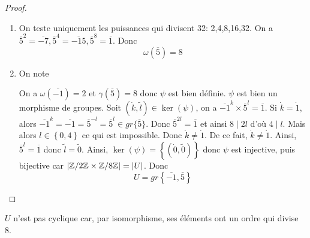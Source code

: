 \documentclass[12pt]{article}
\begin{document}
\begin{proof}
	\phantom{}
	\begin{enumerate}
		\item On teste uniquement les puissances qui divisent 32: 2,4,8,16,32. On a $\overline{5}^{2}=\overline{-7},\overline{5}^{4}=\overline{-15},\overline{5}^{8}=\overline{1}$. Donc 
		\begin{equation}
			\boxed{\omega(\overline{5})=8}
		\end{equation}

		\item On note 
		
		On a $\omega(\overline{-1})=2$ et $\gamma(\overline{5})=8$ donc $\psi$ est bien définie. $\psi$ est bien un morphisme de groupes. Soit $(\dot{k},\tilde{l})\in\ker(\psi)$, on a $\overline{-1}^{k}\times \overline{5}^{l}=\overline{1}$. Si $\dot{k}=\dot{1}$, alors $\overline{-1}^{k}=\overline{-1}=\overline{5}^{-l}=\overline{5}^{l}\in gr\{\overline{5}\}$. Donc $\overline{5}^{2l}=\overline{1}$ et ainsi $8\mid 2l$ d'où $4\mid l$. Mais alors $l\in\left\{0,4\right\}$ ce qui est impossible. Donc $\dot{k}\neq\dot{1}$. De ce fait, $\dot{k}\neq\dot{1}$. Ainsi, $\overline{5}^{l}=\overline{1}$ donc $\tilde{l}=\tilde{0}$. Ainsi, $\ker(\psi)=\left\{(\dot{0},\tilde{0})\right\}$ donc $\psi$ est injective, puis bijective car $\vert\mathbb{Z}/2\mathbb{Z}\times\mathbb{Z}/8\mathbb{Z}\vert=\vert U\vert$. Donc 
		\begin{equation}
			\boxed{U=gr\left\{\overline{-1},\overline{5}\right\}}
		\end{equation}
	\end{enumerate}
\end{proof}

\begin{remark}
	$U$ n'est pas cyclique car, par isomorphisme, ses éléments ont un ordre qui divise 8.
\end{remark}
\end{document}
